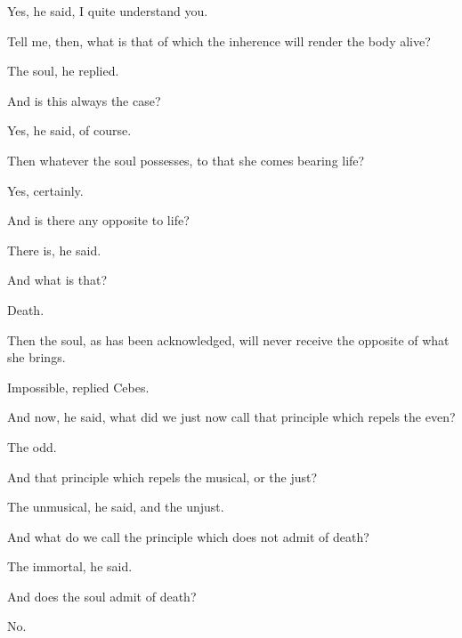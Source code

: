\documentclass[11pt,letter]{article}
\begin{document}
\par  Yes, he said, I quite understand you.

\par  Tell me, then, what is that of which the inherence will render the body alive?

\par  The soul, he replied.

\par  And is this always the case?

\par  Yes, he said, of course.

\par  Then whatever the soul possesses, to that she comes bearing life?

\par  Yes, certainly.

\par  And is there any opposite to life?

\par  There is, he said.

\par  And what is that?

\par  Death.

\par  Then the soul, as has been acknowledged, will never receive the opposite of what she brings.

\par  Impossible, replied Cebes.

\par  And now, he said, what did we just now call that principle which repels the even?

\par  The odd.

\par  And that principle which repels the musical, or the just?

\par  The unmusical, he said, and the unjust.

\par  And what do we call the principle which does not admit of death?

\par  The immortal, he said.

\par  And does the soul admit of death?

\par  No.
\end{document}
